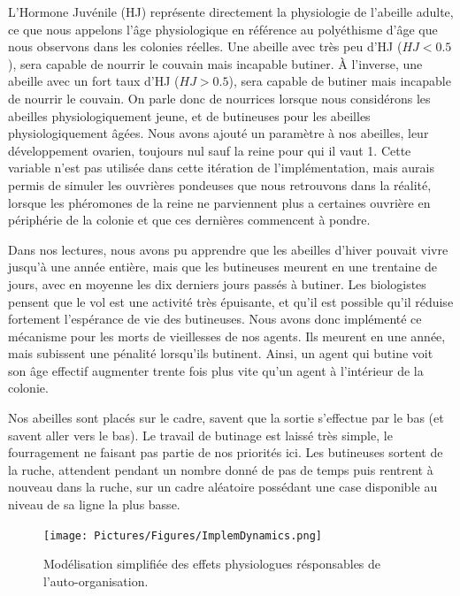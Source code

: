 		L'Hormone Juvénile (HJ) représente directement la physiologie de l'abeille adulte, ce que nous appelons l'âge physiologique en référence au polyéthisme d'âge que nous observons dans les colonies réelles. Une abeille avec très peu d'HJ ($HJ < 0.5$), sera capable de nourrir le couvain mais incapable butiner. À l'inverse, une abeille avec un fort taux d'HJ ($HJ > 0.5$), sera capable de butiner mais incapable de nourrir le couvain. On parle donc de nourrices lorsque nous considérons les abeilles physiologiquement jeune, et de butineuses pour les abeilles physiologiquement âgées. Nous avons ajouté un paramètre à nos abeilles, leur développement ovarien, toujours nul sauf la reine pour qui il vaut 1. Cette variable n'est pas utilisée dans cette itération de l'implémentation, mais aurais permis de simuler les ouvrières pondeuses que nous retrouvons dans la réalité, lorsque les phéromones de la reine ne parviennent plus a certaines ouvrière en périphérie de la colonie et que ces dernières commencent à pondre.
		
		Dans nos lectures, nous avons pu apprendre que les abeilles d'hiver pouvait vivre jusqu'à une année entière, mais que les butineuses meurent en une trentaine de jours, avec en moyenne les dix derniers jours passés à butiner. Les biologistes pensent que le vol est une activité très épuisante, et qu'il est possible qu'il réduise fortement l'espérance de vie des butineuses. Nous avons donc implémenté ce mécanisme pour les morts de vieillesses de nos agents. Ils meurent en une année, mais subissent une pénalité lorsqu'ils butinent. Ainsi, un agent qui butine voit son âge effectif augmenter trente fois plus vite qu'un agent à l'intérieur de la colonie.
		
		Nos abeilles sont placés sur le cadre, savent que la sortie s'effectue par le bas (et savent aller vers le bas). Le travail de butinage est laissé très simple, le fourragement ne faisant pas partie de nos priorités ici. Les butineuses sortent de la ruche, attendent pendant un nombre donné de pas de temps puis rentrent à nouveau dans la ruche, sur un cadre aléatoire possédant une case disponible au niveau de sa ligne la plus basse.
		
			
			\begin{figure}
			\centering
			\texttt{[image: Pictures/Figures/ImplemDynamics.png]}
			\caption[Notre modélisation de la physiologie de l'abeille adulte.]{Modélisation simplifiée des effets physiologues résponsables de l'auto-organisation.}
			\label{HJEODynamics}
			\end{figure}
		
